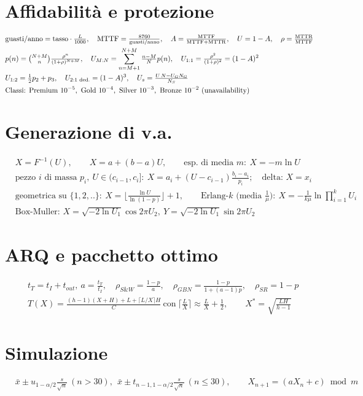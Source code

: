 \section*{Affidabilità e protezione}
\begin{align*}
&\text{guasti/anno}=\text{tasso}\cdot\tfrac{L}{1000},\quad \mathrm{MTTF}=\tfrac{8760}{\text{guasti/anno}},\quad A=\tfrac{\mathrm{MTTF}}{\mathrm{MTTF}+\mathrm{MTTR}},\quad U=1-A,\quad \rho=\tfrac{\mathrm{MTTR}}{\mathrm{MTTF}}\\
&p(n)=\tbinom{N+M}{n}\tfrac{\rho^n}{(1+\rho)^{N+M}},\quad U_{M:N}=\sum_{n=M+1}^{N+M}\tfrac{n-M}{N}p(n),\quad U_{1:1}=\tfrac{\rho^2}{(1+\rho)^2}=(1-A)^2\\
&U_{1:2}=\tfrac12p_2+p_3,\quad U_{\text{2:1 ded.}}=(1-A)^3,\quad U_s=\tfrac{U\,N-U_GN_G}{N_S}\\
&\text{Classi: Premium }10^{-5},\ \text{Gold }10^{-4},\ \text{Silver }10^{-3},\ \text{Bronze }10^{-2}\ (\text{unavailability})
\end{align*}

\section*{Generazione di v.a.}
\begin{align*}
&X=F^{-1}(U),\qquad X=a+(b-a)U,\qquad \text{esp. di media }m:\ X=-m\ln U\\
&\text{pezzo }i\text{ di massa }p_i,\ U\in(c_{i-1},c_i]:\ X=a_i+(U-c_{i-1})\tfrac{b_i-a_i}{p_i};\quad \text{delta: }X=x_i\\
&\text{geometrica su }\{1,2,..\}:\ X=\Big\lfloor\tfrac{\ln U}{\ln(1-p)}\Big\rfloor+1,\qquad \text{Erlang-}k\text{ (media }\tfrac1\mu):\ X=-\tfrac{1}{k\mu}\ln\textstyle\prod_{i=1}^kU_i\\
&\text{Box-Muller: }X=\sqrt{-2\ln U_1}\cos2\pi U_2,\ Y=\sqrt{-2\ln U_1}\sin2\pi U_2
\end{align*}

\section*{ARQ e pacchetto ottimo}
\begin{align*}
&t_T=t_I+t_{out},\ a=\tfrac{t_T}{t_I},\quad \rho_{S\&W}=\tfrac{1-p}{a},\quad \rho_{GBN}=\tfrac{1-p}{1+(a-1)p},\quad \rho_{SR}=1-p\\
&T(X)=\tfrac{(h-1)(X+H)+L+\lceil L/X\rceil H}{C}\ \text{con}\ \lceil\tfrac LX\rceil\approx\tfrac LX+\tfrac12,\qquad X^*=\sqrt{\tfrac{LH}{h-1}}
\end{align*}

\section*{Simulazione}
\begin{align*}
&\bar x\pm u_{1-\alpha/2}\tfrac{s}{\sqrt n}\ (n>30),\ \ \bar x\pm t_{n-1,1-\alpha/2}\tfrac{s}{\sqrt n}\ (n\le30),\qquad X_{n+1}=(aX_n+c)\bmod m
\end{align*}
\normalsize

